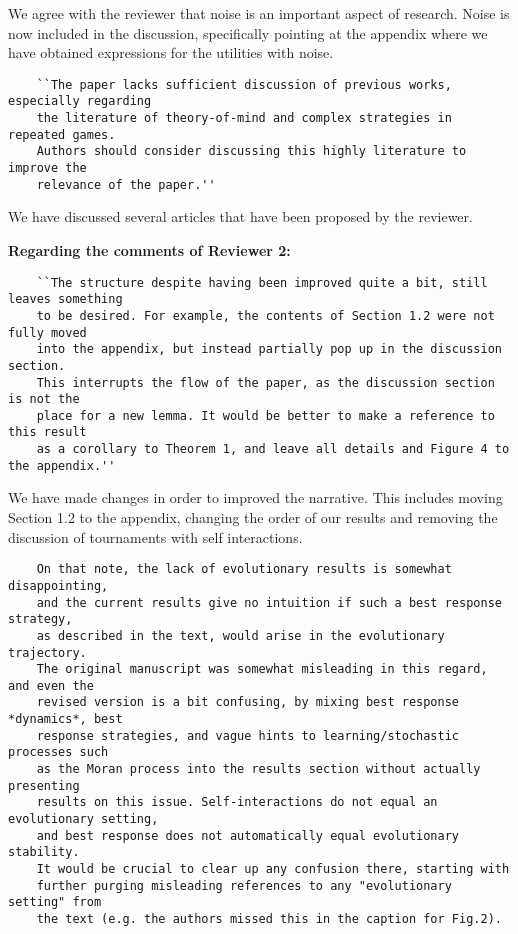 \documentclass{article}
\begin{document}
We agree with the reviewer that noise is an important aspect of research. Noise
is now included in the discussion, specifically pointing at the appendix where
we have obtained expressions for the utilities with noise.

\begin{verbatim}
    ``The paper lacks sufficient discussion of previous works, especially regarding
    the literature of theory-of-mind and complex strategies in repeated games.
    Authors should consider discussing this highly literature to improve the
    relevance of the paper.''
\end{verbatim}

We have discussed several articles
that have been proposed by the reviewer.

\textbf{Regarding the comments of Reviewer 2:}

\begin{verbatim}
    ``The structure despite having been improved quite a bit, still leaves something
    to be desired. For example, the contents of Section 1.2 were not fully moved
    into the appendix, but instead partially pop up in the discussion section.
    This interrupts the flow of the paper, as the discussion section is not the
    place for a new lemma. It would be better to make a reference to this result
    as a corollary to Theorem 1, and leave all details and Figure 4 to the appendix.''
\end{verbatim}

We have made changes in order to improved the narrative. This includes moving
Section 1.2 to the appendix, changing the order of our results and removing
the discussion of tournaments with self interactions.

\begin{verbatim}
    On that note, the lack of evolutionary results is somewhat disappointing,
    and the current results give no intuition if such a best response strategy,
    as described in the text, would arise in the evolutionary trajectory.
    The original manuscript was somewhat misleading in this regard, and even the
    revised version is a bit confusing, by mixing best response *dynamics*, best
    response strategies, and vague hints to learning/stochastic processes such
    as the Moran process into the results section without actually presenting
    results on this issue. Self-interactions do not equal an evolutionary setting,
    and best response does not automatically equal evolutionary stability.
    It would be crucial to clear up any confusion there, starting with
    further purging misleading references to any "evolutionary setting" from
    the text (e.g. the authors missed this in the caption for Fig.2).
\end{verbatim}
\end{document}
